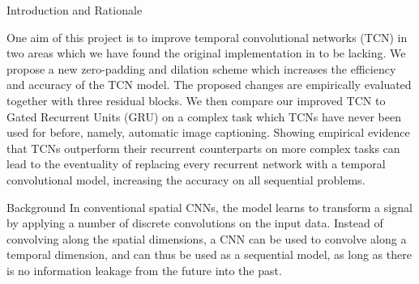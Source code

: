 \documentclass[paperwidth=24in,paperheight=48in, fontscale=0.4166666666666]{baposter}
\begin{document}
\begin{poster}
\begin{posterbox}[name=intro,column=0, below=project]{Introduction and Rationale}
{{\begin{minipage}{{1.55\textwidth}}
\begin{thebibliography}{20}
\end{thebibliography}
\end{minipage}}

}
\vspace{-6pt}

One aim of this project is to improve temporal convolutional networks (TCN) in two areas which we have found the original implementation in \cite{tcn} to be lacking. We propose a new zero-padding and dilation scheme which increases the efficiency and accuracy of the TCN model. The proposed changes are empirically evaluated together with three residual blocks. We then compare our improved TCN to Gated Recurrent Units (GRU) on a complex task which TCNs have never been used for before, namely, automatic image captioning. Showing empirical evidence that TCNs outperform their recurrent counterparts on more complex tasks can lead to the eventuality of replacing every recurrent network with a temporal convolutional model, increasing the accuracy on all sequential problems.
\end{posterbox}















\begin{posterbox}[name=background,column=0,below=intro]{Background}
\vspace{-2pt}
In conventional spatial CNNs, the model learns to transform a signal by applying a number of discrete convolutions on the input data. Instead of convolving along the spatial dimensions, a CNN can be used to convolve along a temporal dimension, and can thus be used as a sequential model, as long as there is no information leakage from the future into the past.
\end{posterbox}
















\end{poster}
\end{document}

